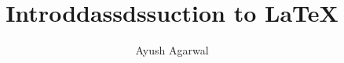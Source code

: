 \documentclass{article}
\begin{document}
\title{Introddassdssuction to \LaTeX{}}
\author{Ayush Agarwal}
\maketitle
\end{document}
